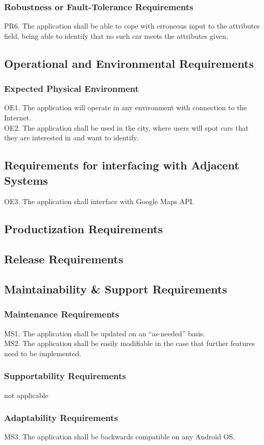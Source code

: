 \documentclass[12pt]{article}
\begin{document}
\subsubsection{Robustness or Fault-Tolerance Requirements}
PR6. The application shall be able to cope with erroneous input to the attributes field, being able to identify that no such car meets the attributes given.
\subsection{Operational and Environmental Requirements}
\subsubsection{Expected Physical Environment}
OE1. The application will operate in any environment with connection to the Internet.\\
OE2. The application shall be used in the city, where users will spot cars that they are interested in and want to identify.
\subsection{Requirements for interfacing with Adjacent Systems}
OE3. The application shall interface with Google Maps API.
\subsection{Productization Requirements}
\subsection{Release Requirements}
\subsection{Maintainability \& Support Requirements}
\subsubsection{Maintenance Requirements}
MS1. The application shall be updated on an “as-needed” basis.\\
MS2. The application shall be easily modifiable in the case that further features need to be implemented.
\subsubsection{Supportability Requirements}
not applicable
\subsubsection{Adaptability Requirements}
MS3. The application shall be backwards compatible on any Android OS.
\end{document}
